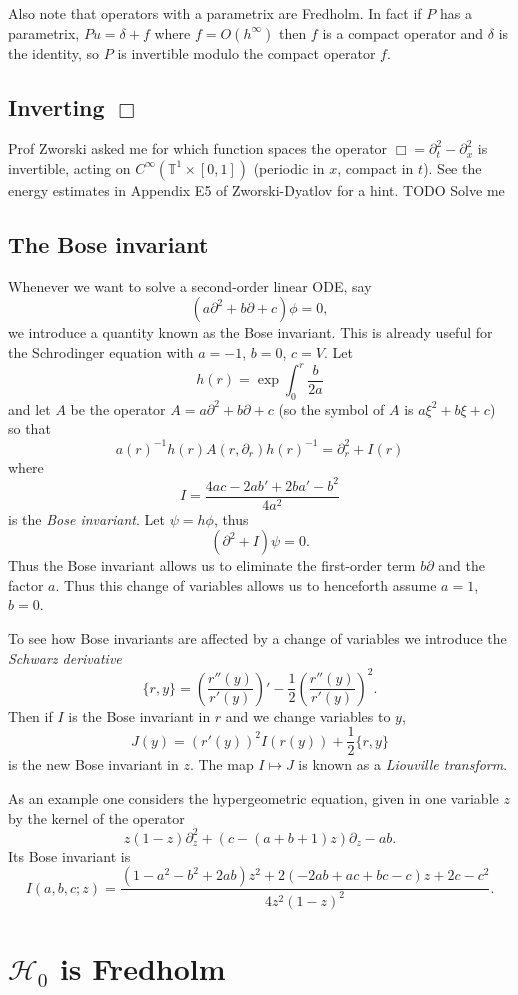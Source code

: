 \documentclass[12pt]{report}
\newcommand{\Torus}{\mathbb{T}}
\theoremstyle{definition}
\begin{document}
Also note that operators with a parametrix are Fredholm. In fact if $P$ has a parametrix, $Pu = \delta + f$ where $f = O(h^\infty)$ then $f$ is a compact operator and $\delta$ is the identity, so $P$ is invertible modulo the compact operator $f$.

\section{Inverting $\Box$}
Prof Zworski asked me for which function spaces the operator $\Box = \partial_t^2 - \partial_x^2$ is invertible, acting on $C^\infty(\Torus^1 \times [0, 1])$ (periodic in $x$, compact in $t$).
See the energy estimates in Appendix E5 of Zworski-Dyatlov for a hint. TODO Solve me

\section{The Bose invariant}
Whenever we want to solve a second-order linear ODE, say
$$(a\partial^2 + b\partial + c)\phi = 0,$$
we introduce a quantity known as the Bose invariant. This is already useful for the Schrodinger equation with $a = -1$, $b = 0$, $c = V$. Let
$$h(r) = \exp\int_0^r \frac{b}{2a}$$
and let $A$ be the operator $A = a\partial^2 + b\partial + c$ (so the symbol of $A$ is $a\xi^2 + b\xi + c$) so that
$$a(r)^{-1}h(r)A(r, \partial_r)h(r)^{-1} = \partial_r^2 + I(r)$$
where
$$I = \frac{4ac - 2ab' + 2ba' - b^2}{4a^2}$$
is the \emph{Bose invariant}.
Let $\psi = h\phi$, thus
$$(\partial^2 + I)\psi = 0.$$
Thus the Bose invariant allows us to eliminate the first-order term $b\partial$ and the factor $a$.
Thus this change of variables allows us to henceforth assume $a = 1$, $b = 0$.

To see how Bose invariants are affected by a change of variables we introduce the \emph{Schwarz derivative}
$$\{r, y\} = \left(\frac{r''(y)}{r'(y)}\right)' - \frac{1}{2}\left(\frac{r''(y)}{r'(y)}\right)^2.$$
Then if $I$ is the Bose invariant in $r$ and we change variables to $y$,
$$J(y) = (r'(y))^2I(r(y)) + \frac{1}{2}\{r, y\}$$
is the new Bose invariant in $z$.
The map $I \mapsto J$ is known as a \emph{Liouville transform}.

As an example one considers the hypergeometric equation, given in one variable $z$ by the kernel of the operator
$$z(1-z)\partial_z^2 + (c - (a+b+1)z)\partial_z - ab.$$
Its Bose invariant is
$$I(a, b, c; z) = \frac{(1 - a^2 - b^2 + 2ab)z^2 + 2(-2ab+ac+bc-c)z + 2c - c^2}{4z^2(1-z)^2}.$$

\chapter{$\mathcal H_0$ is Fredholm}
\end{document}
